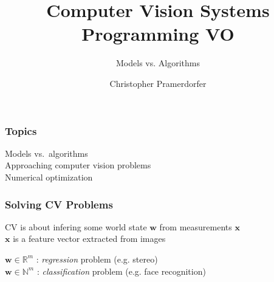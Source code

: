 \documentclass[xetex,professionalfont]{beamer}
\title{Computer Vision Systems Programming VO}
\subtitle{Models vs. Algorithms}
\author{Christopher Pramerdorfer}
\institute{Computer Vision Lab, Vienna University of Technology}
\newcommand{\eg}{\mbox{e.g.}\xspace} %
\newcommand{\NN}{\mathbb{N}}
\newcommand{\RR}{\mathbb{R}}
\renewcommand{\vec}[1]{\ensuremath{\mathbf{#1}}}
\newcommand{\vw}{\vec{w}}
\newcommand{\vx}{\vec{x}}
\begin{document}

\begin{frame}
\maketitle
\end{frame}



\begin{frame}[fragile]
\frametitle{Topics}

Models vs.\ algorithms\\\medskip
Approaching computer vision problems\\\medskip
Numerical optimization

\bigskip
\begin{center}
\end{center}

\end{frame}


\begin{frame}
\frametitle{Solving CV Problems}


CV is about infering some world state $\vw$ from measurements $\vx$ \\\medskip
$\vx$ is a feature vector extracted from images

\bigskip
$\vw\in\RR^m$ : \emph{regression} problem (\eg stereo) \\\medskip
$\vw\in\NN^m$ : \emph{classification} problem (\eg face recognition)

\end{frame}

\end{document}
